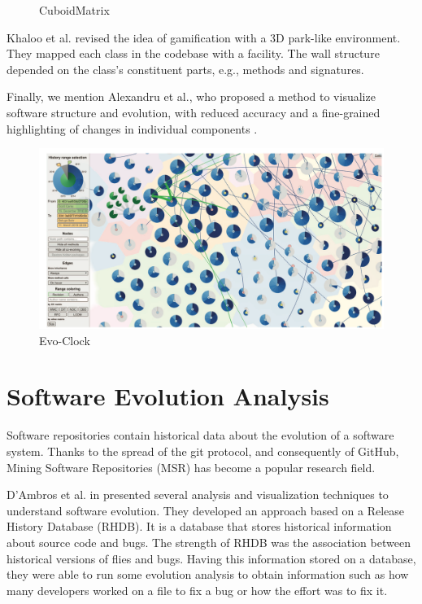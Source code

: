 \begin{figure}[ht]
    \caption{CuboidMatrix}
  \endminipage
  \end{figure}
  


\bigbreak
Khaloo et al. \cite{Khaloo2017} revised the idea of gamification with a 3D park-like environment. They mapped each class in the codebase with a facility. The wall structure depended on the class's constituent parts, e.g., methods and signatures. 

\bigbreak
Finally, we mention Alexandru et al., who proposed a method to visualize software structure and evolution, 
with reduced accuracy and a fine-grained highlighting of changes in individual components \cite{Alexandru2019}. 

\begin{figure}[ht]
\centering
  \includegraphics[width=0.9\linewidth]{Alexandru_EvoClock.png} 
  \caption{Evo-Clock}
\end{figure}


\section{Software Evolution Analysis}

Software repositories contain historical data about the evolution of a software system. 
Thanks to the spread of the git protocol, and consequently of GitHub, 
Mining Software Repositories (MSR) has become a popular research field. 

\bigbreak
D'Ambros et al. in \cite{SoftwareEvolution} presented several analysis and visualization techniques to understand software evolution. 
They developed an approach based on a Release History Database (RHDB). 
It is a database that stores historical information about source code and bugs. 
The strength of RHDB was the association between historical versions of flies and bugs. 
Having this information stored on a database, they were able to run some evolution analysis to obtain information such as how many developers worked on a file to fix a bug or how the effort was to fix it.  

